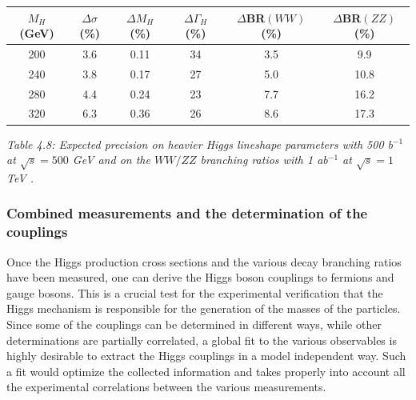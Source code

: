 \begin{table}[hbt]
\renewcommand{\arraystretch}{1.2}
\begin{center}
\begin{tabular}{|c|c|c|c||c|c|}
\hline
$M_H$(GeV) & $\Delta \sigma$(\%)&$\Delta M_H$(\%)&$\Delta\Gamma_H$ (\%) &
$\Delta$BR$(WW)$ (\%)  & $\Delta$BR$(ZZ)$ (\%) \\ \hline
200 & 3.6 & 0.11& 34 & 3.5 & 9.9   \\ 
240 & 3.8 & 0.17& 27 & 5.0 & 10.8   \\
280 & 4.4 & 0.24& 23 & 7.7 & 16.2   \\
320 & 6.3 & 0.36& 26 & 8.6 & 17.3   \\ \hline
\end{tabular}
\end{center}
\vspace*{-0mm}
{\it Table 4.8: Expected precision on heavier Higgs lineshape parameters with 
500 b$^{-1}$ at $\sqrt{s}=500$ GeV \cite{Desch} and on the $WW/ZZ$ branching 
ratios with 1 ab$^{-1}$ at $\sqrt{s}=1$ TeV \cite{Barklow}. }
\vspace{-.5cm}
\end{table}

\newpage

\subsubsection{Combined measurements and the determination of the 
couplings}

Once the Higgs production cross sections and the various decay branching ratios
have been measured, one can derive the Higgs boson couplings to
fermions and gauge bosons. This is a crucial test for the experimental 
verification that the Higgs mechanism is responsible for the generation of the
masses of the particles. Since some of the couplings can be determined in
different ways, while other determinations are partially correlated, a global
fit to the various observables is highly desirable to extract the Higgs 
couplings in a model independent way. Such a fit would optimize the collected
information and takes properly into account all the experimental correlations
between the various measurements. \s

